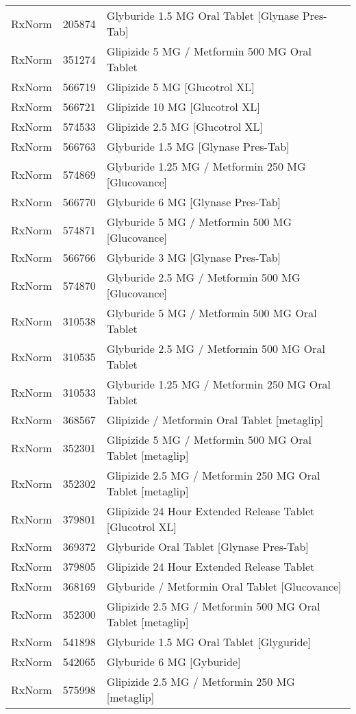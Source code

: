\begin{longtable}{p{}p{}p{}}
  RxNorm & 205874 & Glyburide 1.5 MG Oral Tablet [Glynase Pres-Tab] \\ 
  RxNorm & 351274 & Glipizide 5 MG / Metformin 500 MG Oral Tablet \\ 
  RxNorm & 566719 & Glipizide 5 MG [Glucotrol XL] \\ 
  RxNorm & 566721 & Glipizide 10 MG [Glucotrol XL] \\ 
  RxNorm & 574533 & Glipizide 2.5 MG [Glucotrol XL] \\ 
  RxNorm & 566763 & Glyburide 1.5 MG [Glynase Pres-Tab] \\ 
  RxNorm & 574869 & Glyburide 1.25 MG / Metformin 250 MG [Glucovance] \\ 
  RxNorm & 566770 & Glyburide 6 MG [Glynase Pres-Tab] \\ 
  RxNorm & 574871 & Glyburide 5 MG / Metformin 500 MG [Glucovance] \\ 
  RxNorm & 566766 & Glyburide 3 MG [Glynase Pres-Tab] \\ 
  RxNorm & 574870 & Glyburide 2.5 MG / Metformin 500 MG [Glucovance] \\ 
  RxNorm & 310538 & Glyburide 5 MG / Metformin 500 MG Oral Tablet \\ 
  RxNorm & 310535 & Glyburide 2.5 MG / Metformin 500 MG Oral Tablet \\ 
  RxNorm & 310533 & Glyburide 1.25 MG / Metformin 250 MG Oral Tablet \\ 
  RxNorm & 368567 & Glipizide / Metformin Oral Tablet [metaglip] \\ 
  RxNorm & 352301 & Glipizide 5 MG / Metformin 500 MG Oral Tablet [metaglip] \\ 
  RxNorm & 352302 & Glipizide 2.5 MG / Metformin 250 MG Oral Tablet [metaglip] \\ 
  RxNorm & 379801 & Glipizide 24 Hour Extended Release Tablet [Glucotrol XL] \\ 
  RxNorm & 369372 & Glyburide Oral Tablet [Glynase Pres-Tab] \\ 
  RxNorm & 379805 & Glipizide 24 Hour Extended Release Tablet \\ 
  RxNorm & 368169 & Glyburide / Metformin Oral Tablet [Glucovance] \\ 
  RxNorm & 352300 & Glipizide 2.5 MG / Metformin 500 MG Oral Tablet [metaglip] \\ 
  RxNorm & 541898 & Glyburide 1.5 MG Oral Tablet [Glyguride] \\ 
  RxNorm & 542065 & Glyburide 6 MG [Gyburide] \\ 
  RxNorm & 575998 & Glipizide 2.5 MG / Metformin 250 MG [metaglip] \\ 

\end{longtable}

